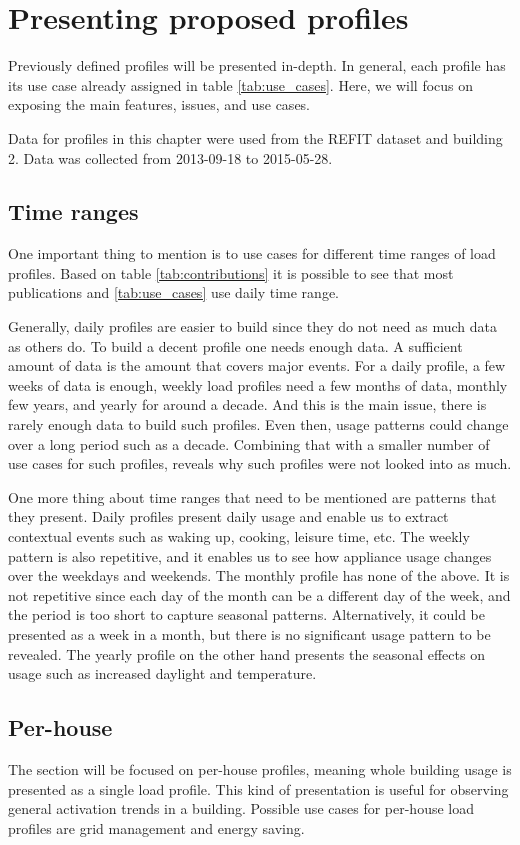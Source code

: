 \label{chapter6}
\chapter{Presenting proposed profiles}

Previously defined profiles will be presented in-depth. 
In general, each profile has its use case already assigned in table \ref{tab:use_cases}.
Here, we will focus on exposing the main features, issues, and use cases. 

Data for profiles in this chapter were used from the REFIT dataset and building 2.
Data was collected from 2013-09-18 to 2015-05-28.
\section{Time ranges}
One important thing to mention is to use cases for different time ranges of load profiles.
Based on table \ref{tab:contributions} it is possible to see that most publications and \ref{tab:use_cases} use daily time range.

Generally, daily profiles are easier to build since they do not need as much data as others do.
To build a decent profile one needs enough data. A sufficient amount of data is the amount that covers major events.
For a daily profile, a few weeks of data is enough, weekly load profiles need a few months of data, monthly few years, and yearly for around a decade.
And this is the main issue, there is rarely enough data to build such profiles.
Even then, usage patterns could change over a long period such as a decade.
Combining that with a smaller number of use cases for such profiles, reveals why such profiles were not looked into as much.

One more thing about time ranges that need to be mentioned are patterns that they present.
Daily profiles present daily usage and enable us to extract contextual events such as waking up, cooking, leisure time, etc.
The weekly pattern is also repetitive, and it enables us to see how appliance usage changes over the weekdays and weekends.
The monthly profile has none of the above. It is not repetitive since each day of the month can be a different day of the week, and the period is too short to capture seasonal patterns.
Alternatively, it could be presented as a week in a month, but there is no significant usage pattern to be revealed.
The yearly profile on the other hand presents the seasonal effects on usage such as increased daylight and temperature. 


\section{Per-house}
The section will be focused on per-house profiles, meaning whole building usage is presented as a single load profile.
This kind of presentation is useful for observing general activation trends in a building.
Possible use cases for per-house load profiles are grid management and energy saving.

